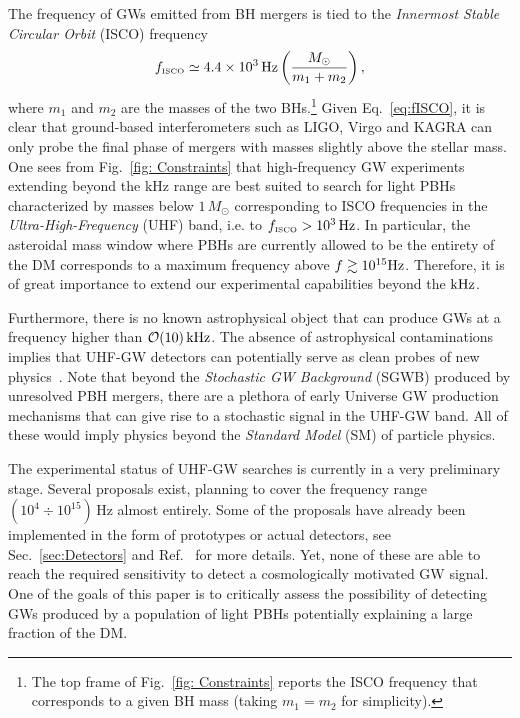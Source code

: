 \documentclass[11pt,a4paper]{article}
\newcommand{\lp }{\left (}
\newcommand{\rp }{\right )}
\begin{document}
The frequency of GWs emitted from BH mergers is tied to the \textit{Innermost Stable Circular Orbit} (ISCO) frequency
 \begin{equation}
\label{eq:fISCO}
f_\text{\tiny ISCO} \simeq  4.4 \times 10^3 \, {\rm Hz} \lp \frac{M_{\odot}}{m_1 + m_2} \rp,
\end{equation} 
where $m_1$ and $m_2$ are the masses of the two BHs.\footnote{The top frame of Fig.~\ref{fig: Constraints} reports the ISCO frequency that corresponds to a given BH mass (taking $m_1 = m_2$ for simplicity).}
Given Eq.~\eqref{eq:fISCO}, it is clear that ground-based interferometers such as LIGO, Virgo and KAGRA can only probe the final phase of mergers with masses slightly above the stellar mass.
One sees from Fig.~\ref{fig: Constraints} that high-frequency GW experiments extending beyond the kHz range are best suited to search for light PBHs
characterized by masses below $1 \, M_{\odot}$ corresponding to ISCO frequencies in the \textit{Ultra-High-Frequency} (UHF) band, i.e. to $f_\text{\tiny ISCO} > 10^3 \, \rm{Hz}$. 
In particular, the asteroidal mass window where PBHs are currently allowed to be the entirety of the DM corresponds to a maximum frequency above $f\gtrsim 10^{15} {\rm Hz}$.
Therefore, it is of great importance to extend our experimental capabilities beyond the $\rm{kHz}$. 


Furthermore, there is no known astrophysical object that can produce GWs at a frequency higher than $\mathcal{O}(10) \, \rm{kHz}$. The absence of astrophysical contaminations implies that UHF-GW detectors can
potentially serve as  clean probes of new physics~\cite{Maggiore:1999vm, Aggarwal:2020olq}. Note that beyond the \textit{Stochastic GW Background} (SGWB) produced by unresolved PBH mergers, there are  a plethora of early Universe GW production mechanisms that can give rise to a stochastic signal in the UHF-GW band. All of these would  imply physics beyond the  \textit{ Standard Model} (SM) of particle physics.

The experimental status of UHF-GW searches is currently in a very preliminary stage. 
Several proposals exist, planning to cover the frequency range $(10^4 \div 10^{15}) \, \text{Hz}$ almost entirely. 
Some of the proposals have already been implemented in the form of prototypes or actual detectors, see Sec.~\ref{sec:Detectors} and Ref.~\cite{Aggarwal:2020olq} for more details. Yet, none of these are able to reach the required sensitivity to detect a cosmologically motivated GW signal. 
One of the goals of this paper is to critically assess the possibility of detecting GWs produced by a population of light PBHs potentially explaining a large fraction of the DM.
\end{document}
